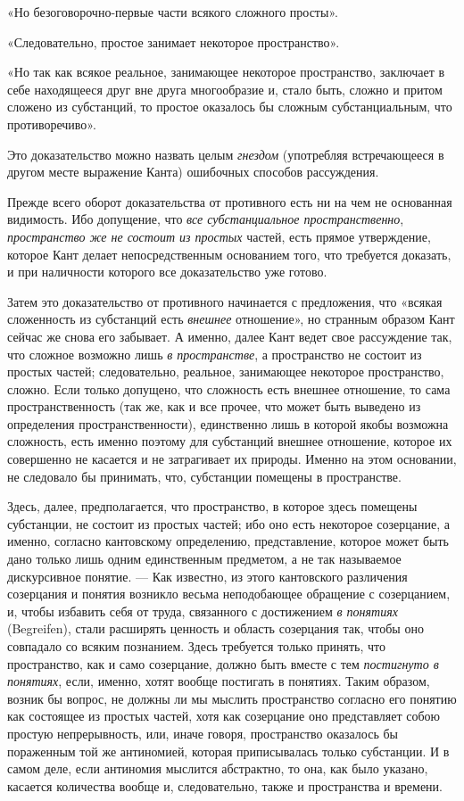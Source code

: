 «Но безоговорочно-первые части всякого сложного просты».

«Следовательно, простое занимает некоторое пространство».

«Но так как всякое реальное, занимающее некоторое пространство, заключает в
себе находящееся друг вне друга многообразие и, стало быть, сложно и притом
сложено из субстанций, то простое оказалось бы сложным субстанциальным, что
противоречиво».

Это доказательство можно назвать целым {\em гнездом}
(употребляя встречающееся в другом месте выражение Канта) ошибочных
способов рассуждения.

Прежде всего оборот доказательства от противного есть ни на чем не
основанная видимость. Ибо допущение, что {\em все
субстанциальное пространственно}, {\em пространство же
не состоит из простых} частей, есть прямое утверждение, которое Кант делает
непосредственным основанием того, что требуется доказать, и при наличности
которого все доказательство уже готово.

Затем это доказательство от противного начинается с предложения, что «всякая
сложенность из субстанций есть {\em внешнее}
отношение», но странным образом Кант сейчас же снова его забывает. А
именно, далее Кант ведет свое рассуждение так, что сложное возможно лишь
{\em в пространстве}, а пространство не состоит из
простых частей; следовательно, реальное, занимающее некоторое пространство,
сложно. Если только допущено, что сложность есть внешнее отношение, то сама
пространственность (так же, как и все прочее, что может быть выведено из
определения пространственности), единственно лишь в которой якобы возможна
сложность, есть именно поэтому для субстанций внешнее отношение, которое их
совершенно не касается и не затрагивает их природы. Именно на этом
основании, не следовало бы принимать, что, субстанции помещены в
пространстве.

Здесь, далее, предполагается, что пространство, в которое здесь помещены
субстанции, не состоит из простых частей; ибо оно есть некоторое
созерцание, а именно, согласно кантовскому определению, представление,
которое может быть дано только лишь одним единственным предметом, а не так
называемое дискурсивное понятие. — Как известно, из этого кантовского
различения созерцания и понятия возникло весьма неподобающее обращение с
созерцанием, и, чтобы избавить себя от труда, связанного с достижением
{\em в понятиях} (Begreifen), стали расширять ценность
и область созерцания так, чтобы оно совпадало со всяким познанием. Здесь
требуется только принять, что пространство, как и само созерцание, должно
быть вместе с тем {\em постигнуто в понятиях}, если,
именно, хотят вообще постигать в понятиях. Таким образом, возник бы вопрос,
не должны ли мы мыслить пространство согласно его понятию как состоящее из
простых частей, хотя как созерцание оно представляет собою простую
непрерывность, или, иначе говоря, пространство оказалось бы пораженным той
же антиномией, которая приписывалась только субстанции. И в самом деле,
если антиномия мыслится абстрактно, то она, как было указано, касается
количества вообще и, следовательно, также и пространства и времени.

